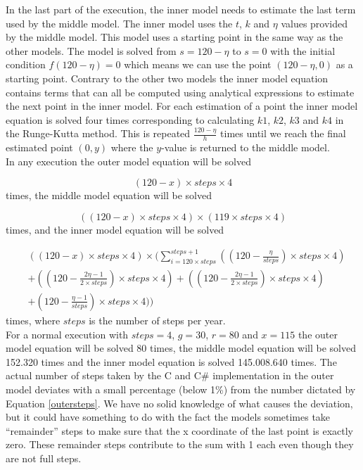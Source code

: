 	In the last part of the execution, the inner model needs to estimate the last term used by the middle model. The inner model uses the $t$, $k$ and $\eta$ values provided by the middle model. This model uses a starting point in the same way as the other models. The model is solved from $s = 120 - \eta$ to $s=0$ with the initial condition $f(120 - \eta) = 0$ which means we can use the point $(120-\eta,0)$ as a starting point. Contrary to the other two models the inner model equation contains terms that can all be computed using analytical expressions to estimate the next point in the inner model. For each estimation of a point the inner model equation is solved four times corresponding to calculating $k1$, $k2$, $k3$ and $k4$ in the Runge-Kutta method. This is repeated $\frac{120 - \eta}{h}$ times until we reach the final estimated point $(0,y)$ where the $y$-value is returned to the middle model. \\ 
	
	\noindent In any execution the outer model equation will be solved 
	
	\begin{equation}
	(120-x) \times steps \times 4
	\end{equation} times, the middle model equation will be solved 
	
	\begin{equation}
	((120-x) \times steps \times 4) \times (119 \times steps \times 4)
	\end{equation} times, and the inner model equation will be solved 
	
	\begin{align}
 \nonumber&((120-x) \times steps \times 4) \times  
	(\sum\limits_{i=120 \times steps}^{steps+1} 
	( 
	(120 - \frac{\eta}{steps}) \times steps \times 4) \\ \nonumber & + 
	((120 - \frac{2\eta - 1}{2 \times steps})\times steps \times 4) + 
	((120 - \frac{2\eta - 1}{2 \times steps})\times steps \times 4) \\& +
	(120 - \frac{\eta-1}{steps}) \times steps \times 4)
	)
	\label{outersteps}
	\end{align} times, where $steps$ is the number of steps per year.\\
	
	For a normal execution with $steps=4$, $g=30$, $r=80$ and $x=115$ the outer model equation will be solved 80 times, the middle model equation will be solved 152.320 times and the inner model equation is solved 145.008.640 times. The actual number of steps taken by the C and C\# implementation in the outer model deviates with a small percentage (below 1\%) from the number dictated by Equation \ref{outersteps}. We have no solid knowledge of what causes the deviation, but it could have something to do with the fact the models sometimes take ``remainder'' steps to make sure that the x coordinate of the last point is exactly zero. These remainder steps contribute to the sum with 1 each even though they are not full steps.
